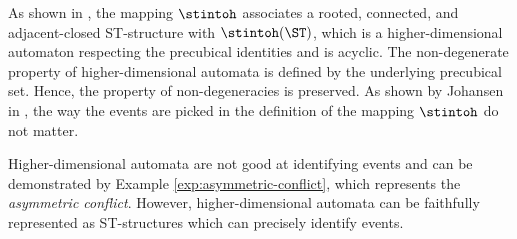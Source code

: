     As shown in \cite[Theorem 3.36]{Johansen16STstruct}, the mapping $\stintoh$ associates a rooted, connected, and adjacent-closed ST-structure with $\stintoh(\ST)$, which is a higher-dimensional automaton respecting the precubical identities and is acyclic. The non-degenerate property of higher-dimensional automata is defined by the underlying precubical set. Hence, the property of non-degeneracies is preserved. As shown by Johansen in \cite[Lemma 3.37]{Johansen16STstruct}, the way the events are picked in the definition of the mapping $\stintoh$ do not matter.


    Higher-dimensional automata are not good at identifying events and can be demonstrated by Example \ref{exp:asymmetric-conflict}, which represents the \emph{asymmetric conflict}. However, higher-dimensional automata can be faithfully represented as ST-structures which can precisely identify events.


